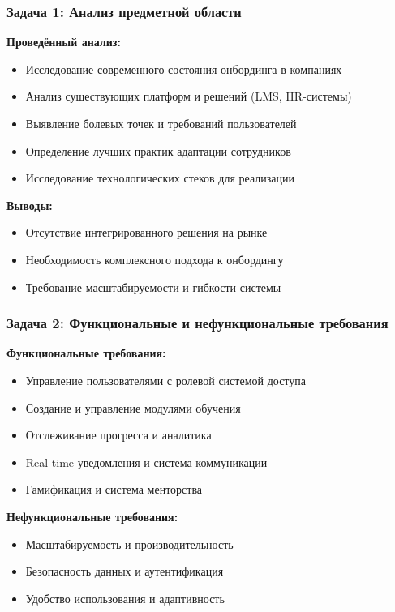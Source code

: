 \documentclass[aspectratio=43,11pt]{beamer}
\begin{document}
\begin{frame}
    \frametitle{Задача 1: Анализ предметной области}
    
    \textbf{Проведённый анализ:}
    \begin{itemize}
        \item Исследование современного состояния онбординга в компаниях
        \item Анализ существующих платформ и решений (LMS, HR-системы)
        \item Выявление болевых точек и требований пользователей
        \item Определение лучших практик адаптации сотрудников
        \item Исследование технологических стеков для реализации
    \end{itemize}
    
    \bigskip
    
    \textbf{Выводы:}
    \begin{itemize}
        \item Отсутствие интегрированного решения на рынке
        \item Необходимость комплексного подхода к онбордингу
        \item Требование масштабируемости и гибкости системы
    \end{itemize}
\end{frame}

\begin{frame}
    \frametitle{Задача 2: Функциональные и нефункциональные требования}
    
    \textbf{Функциональные требования:}
    \begin{itemize}
        \item Управление пользователями с ролевой системой доступа
        \item Создание и управление модулями обучения
        \item Отслеживание прогресса и аналитика
        \item Real-time уведомления и система коммуникации
        \item Гамификация и система менторства
    \end{itemize}
    
    \bigskip
    
    \textbf{Нефункциональные требования:}
    \begin{itemize}
        \item Масштабируемость и производительность
        \item Безопасность данных и аутентификация
        \item Удобство использования и адаптивность
    \end{itemize}
\end{frame}
\end{document}
